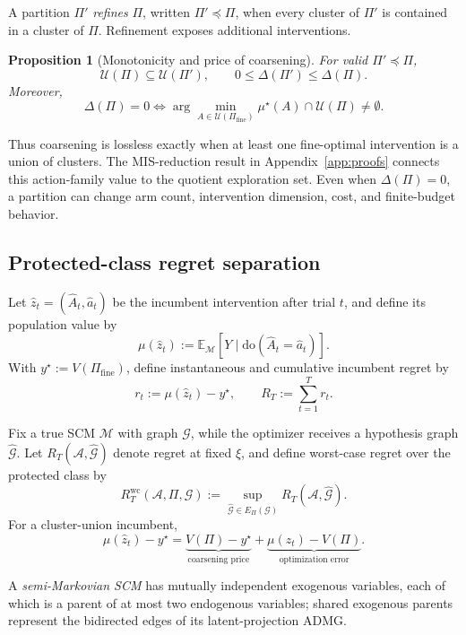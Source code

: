 \documentclass[twoside]{article}
\newtheorem{proposition}{Proposition}
\newcommand{\E}{\mathbb{E}}
\newcommand{\doo}{\mathrm{do}}
\newcommand{\Gg}{\mathcal{G}}
\begin{document}
A partition \(\Pi'\) \emph{refines} \(\Pi\), written \(\Pi'\preceq\Pi\), when every cluster of \(\Pi'\) is contained in a cluster of \(\Pi\). Refinement exposes additional interventions.

\begin{proposition}[Monotonicity and price of coarsening]
\label{prop:price}
For valid \(\Pi'\preceq\Pi\),
\[
 \mathcal U(\Pi)\subseteq\mathcal U(\Pi'),
 \qquad
 0\le\Delta(\Pi')\le\Delta(\Pi).
\]
Moreover,
\[
 \Delta(\Pi)=0
 \iff
 \arg\min_{A\in\mathcal U(\Pi_{\mathrm{fine}})}\mu^\star(A)
 \cap\mathcal U(\Pi)\ne\emptyset.
\]
\end{proposition}

Thus coarsening is lossless exactly when at least one fine-optimal intervention is a union of clusters. The MIS-reduction result in Appendix~\ref{app:proofs} connects this action-family value to the quotient exploration set. Even when \(\Delta(\Pi)=0\), a partition can change arm count, intervention dimension, cost, and finite-budget behavior.

\subsection{Protected-class regret separation}
\label{sec:separation}

Let \(\hat z_t=(\hat A_t,\hat a_t)\) be the incumbent intervention after trial \(t\), and define its population value by
\[
 \mu(\hat z_t):=\E_{\mathcal M}
 [Y\mid\doo(\hat A_t=\hat a_t)].
\]
With \(y^\star:=V(\Pi_{\mathrm{fine}})\), define instantaneous and cumulative incumbent regret by
\begin{equation}
 r_t:=\mu(\hat z_t)-y^\star,
 \qquad
 R_T:=\sum_{t=1}^{T}r_t.
 \label{eq:regret}
\end{equation}

Fix a true SCM \(\mathcal M\) with graph \(\Gg\), while the optimizer receives a hypothesis graph \(\widehat{\Gg}\). Let \(R_T(\mathcal A,\widehat{\Gg})\) denote regret at fixed \(\xi\), and define worst-case regret over the protected class by
\[
 R_T^{\mathrm{wc}}(\mathcal A,\Pi,\Gg)
 :=\sup_{\widehat{\Gg}\in E_\Pi(\Gg)}
 R_T(\mathcal A,\widehat{\Gg}).
\]
For a cluster-union incumbent,
\begin{equation}
 \mu(\hat z_t)-y^\star
 =\underbrace{V(\Pi)-y^\star}_{\text{coarsening price}}
 +\underbrace{\mu(\hat z_t)-V(\Pi)}_{\text{optimization error}}.
 \label{eq:regret-decomposition}
\end{equation}

A \emph{semi-Markovian SCM} has mutually independent exogenous variables, each of which is a parent of at most two endogenous variables; shared exogenous parents represent the bidirected edges of its latent-projection ADMG.
\end{document}
